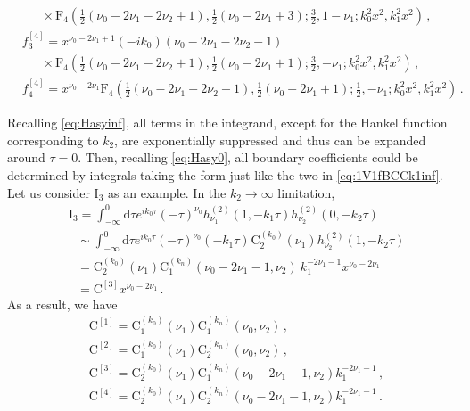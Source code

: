\documentclass[a4paper,11pt]{article}
\newcommand{\nn}{\nonumber}
\newcommand{\nd}{\mathrm{d}}
\begin{document}
\begin{align}
&~~~~~~~\times
\text{F}_4\left(\frac{1}{2} \left(\nu _0-2 \nu _1-2 \nu _2+1\right),\frac{1}{2} \left(\nu _0-2 \nu _1+3\right);\frac{3}{2},1-\nu _1;k_0^2 x^2,k_1^2 x^2\right)       \, , \nn\\ 
&f_{3}^{[4]}=
x^{\nu _0-2 \nu _1+1} (-i k_0) \left(\nu _0-2 \nu _1-2 \nu _2-1\right)   \nn\\
&~~~~~~~\times 
\text{F}_4\left(\frac{1}{2} \left(\nu _0-2 \nu _1-2 \nu _2+1\right),\frac{1}{2} \left(\nu _0-2 \nu _1+1\right);\frac{3}{2},-\nu _1;k_0^2 x^2,k_1^2 x^2\right)       \, , \nn\\ 
&f_{4}^{[4]}=
x^{\nu _0-2 \nu _1}
\text{F}_4\left(\frac{1}{2} \left(\nu _0-2 \nu _1-2 \nu _2-1\right),\frac{1}{2} \left(\nu _0-2 \nu _1+1\right);\frac{1}{2},-\nu _1;k_0^2 x^2,k_1^2 x^2\right)  
      \, .
\end{align}



Recalling \eqref{eq:Hasyinf}, all terms in the integrand, except for the Hankel function corresponding to $k_2$, are exponentially suppressed and thus can be expanded around $\tau=0$. Then, recalling \eqref{eq:Hasy0}, all boundary coefficients could be determined by integrals taking the form just like the two in \eqref{eq:1V1fBCCk1inf}. Let us consider $\text{I}_{3}$ as an example. In the $k_2\to \infty$ limitation,
\begin{align}
&\text{I}_{3}=\int_{-\infty}^0 \nd \tau e^{ i k_0 \tau} (-\tau)^{\nu_0} h^{(2)}_{\nu_1}(1,-k_1\tau) h^{(2)}_{\nu_2}(0,-k_2\tau) \nn\\
&~~~ \sim \int_{-\infty}^0 \nd \tau e^{ i k_0 \tau} (-\tau)^{\nu_0} (-k_1\tau)^{} \text{C}_2^{(k_0)}(\nu_1) h^{(2)}_{\nu_2}(1,-k_2\tau) \nn\\
&~~~ = \text{C}_2^{(k_0)}(\nu_1)  \text{C}_1^{(k_n)}(\nu_0-2\nu_1-1,\nu_2) ~ k_1^{-2\nu_1-1}  x^{\nu_0-2\nu_1} \nn\\
&~~~ = \text{C}^{[3]}  x^{\nu_0-2\nu_1} \,.
\end{align}
As a result, we have 
\begin{align}
&\text{C}^{[1]}=\text{C}^{(k_0)}_1\left(\nu _1\right) \text{C}^{(k_n)}_1\left(\nu _0,\nu _2\right)   \,, \nn\\
&\text{C}^{[2]}=\text{C}^{(k_0)}_1\left(\nu _1\right) \text{C}^{(k_n)}_2\left(\nu _0,\nu _2\right) \,, \nn\\
&\text{C}^{[3]}= \text{C}^{(k_0)}_2\left(\nu _1\right) \text{C}^{(k_n)}_1\left(\nu _0-2 \nu _1-1,\nu _2\right) k_1^{-2 \nu _1-1} \,, \nn\\
&\text{C}^{[4]}=  \text{C}^{(k_0)}_2\left(\nu _1\right) \text{C}^{(k_n)}_2\left(\nu _0-2 \nu _1-1,\nu _2\right) k_1^{-2 \nu _1-1} \,.
\end{align}
\end{document}
